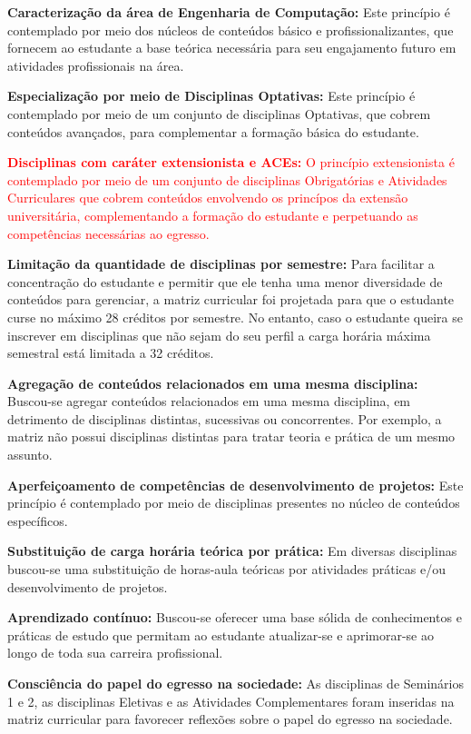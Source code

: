\begin{itemize}
    \item \textbf{Caracterização da área de Engenharia de Computação:} Este princípio é contemplado por meio dos núcleos de conteúdos básico e profissionalizantes, que fornecem ao estudante a base teórica necessária para seu engajamento futuro em atividades profissionais na área.
    \item \textbf{Especialização por meio de Disciplinas Optativas:} Este princípio é contemplado por meio de um conjunto de disciplinas Optativas, que cobrem conteúdos avançados, para complementar a formação básica do estudante.
    \textcolor{red}{\item \textbf{Disciplinas com caráter extensionista e ACEs:} O princípio extensionista é contemplado por meio de um conjunto de disciplinas Obrigatórias e Atividades Curriculares que cobrem conteúdos envolvendo os princípos da extensão universitária, complementando a formação do estudante e perpetuando as competências necessárias ao egresso.}
    \item \textbf{Limitação da quantidade de disciplinas por semestre:} Para facilitar a concentração do estudante e permitir que ele tenha uma menor diversidade de conteúdos para gerenciar, a matriz curricular foi projetada para que o estudante curse no máximo 28 créditos por semestre. No entanto, caso o estudante queira se inscrever em disciplinas que não sejam do seu perfil a carga horária máxima semestral está limitada a 32 créditos.
    \item \textbf{Agregação de conteúdos relacionados em uma mesma disciplina:} Buscou-se agregar conteúdos relacionados em uma mesma disciplina, em detrimento de disciplinas distintas, sucessivas ou concorrentes. Por exemplo, a matriz não possui disciplinas distintas para tratar teoria e prática de um mesmo assunto.
    \item \textbf{Aperfeiçoamento de competências de desenvolvimento de projetos:} Este princípio é contemplado por meio de disciplinas presentes no núcleo de conteúdos específicos.
    \item \textbf{Substituição de carga horária teórica por prática:} Em diversas disciplinas buscou-se uma substituição de horas-aula teóricas por atividades práticas e/ou desenvolvimento de projetos.
    \item \textbf{Aprendizado contínuo:} Buscou-se oferecer uma base sólida de conhecimentos e práticas de estudo que permitam ao estudante atualizar-se e aprimorar-se ao longo de toda sua carreira profissional.
    \item \textbf{Consciência do papel do egresso na sociedade:} As disciplinas de Seminários 1 e 2, as disciplinas Eletivas e as Atividades Complementares foram inseridas na matriz curricular para favorecer reflexões sobre o papel do egresso na sociedade.
\end{itemize}



